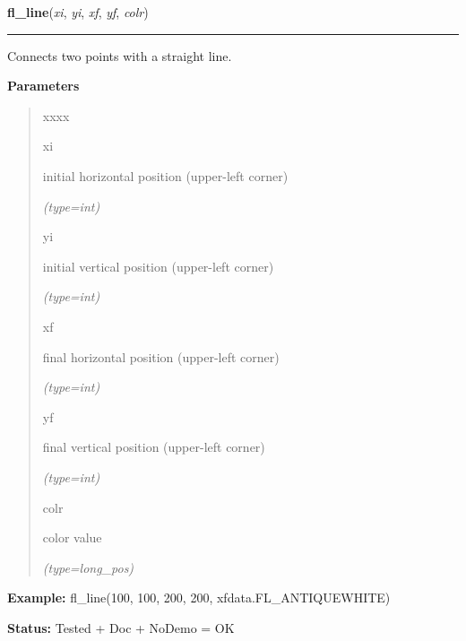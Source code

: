 \hspace{.8\funcindent}\begin{boxedminipage}{\funcwidth}

    \raggedright \textbf{fl\_line}(\textit{xi}, \textit{yi}, \textit{xf}, \textit{yf}, \textit{colr})

    \vspace{-1.5ex}

    \rule{\textwidth}{0.5\fboxrule}
\setlength{\parskip}{2ex}
    Connects two points with a straight line.

\setlength{\parskip}{1ex}
      \textbf{Parameters}
      \vspace{-1ex}

      \begin{quote}
        \begin{Ventry}{xxxx}

          \item[xi]

          initial horizontal position (upper-left corner)

            {\it (type=int)}

          \item[yi]

          initial vertical position (upper-left corner)

            {\it (type=int)}

          \item[xf]

          final horizontal position (upper-left corner)

            {\it (type=int)}

          \item[yf]

          final vertical position (upper-left corner)

            {\it (type=int)}

          \item[colr]

          color value

            {\it (type=long\_pos)}

        \end{Ventry}

      \end{quote}

\textbf{Example:} fl\_line(100, 100, 200, 200, xfdata.FL\_ANTIQUEWHITE)



\textbf{Status:} Tested + Doc + NoDemo = OK



    \end{boxedminipage}

